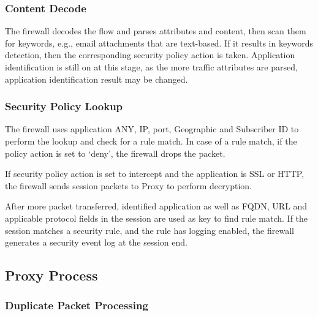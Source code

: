 \subsubsection*{\hypertarget{link:Content Decode}{Content Decode}}
\label{sec:appendix_e:sequence:firewall:contentdecode}

The firewall decodes the flow and parses attributes and content, then scan them for keywords, e.g., email attachments that are text-based. If it results in keywords detection, then the corresponding security policy action is taken. Application identification is still on at this stage, as the more traffic attributes are parsed, application identification result may be changed. 

\subsubsection*{\hypertarget{link:Security Policy Lookup}{Security Policy Lookup}}
\label{sec:appendix_e:sequence:firewall:lookup}

The firewall uses application ANY, IP, port, Geographic and Subscriber ID to perform the lookup and check for a rule match. In case of a rule match, if the policy action is set to ‘deny’, the firewall drops the packet. 


If security policy action is set to intercept and the application is SSL or HTTP, the firewall sends session packets to Proxy to perform decryption.


After more packet transferred, identified application as well as FQDN, URL and applicable protocol fields in the session are used as key to find rule match. If the session matches a security rule, and the rule has logging enabled, the firewall generates a security event log at the session end.

\subsection*{\hypertarget{link:Proxy Process}{Proxy Process}}
\label{sec:appendix_e:sequence:proxy}

\subsubsection*{\hypertarget{link:Duplicate Packet Processing}{Duplicate Packet Processing}}
\label{sec:appendix_e:sequence:proxy:duplicate}

